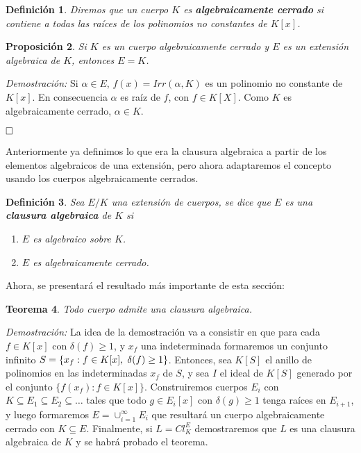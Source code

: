 \documentclass[12pt]{article}
\newtheorem{theorem}{Teorema}[section]
\newtheorem{proposition}[theorem]{Proposición}
\newtheorem{definition}[theorem]{Definición}
\begin{document}
\begin{definition} Diremos que un cuerpo $K$ es \textbf{algebraicamente cerrado} si contiene a todas las raíces de los polinomios no constantes de $K[x]$.
\end{definition}

\begin{proposition}Si $K$ es un cuerpo algebraicamente cerrado y $E$ es un extensión algebraica de $K$, entonces $E = K$.
\end{proposition}
\emph{Demostración: } Si $\alpha \in E$, $f(x) = Irr(\alpha, K)$ es un polinomio no constante de $K[x]$. En consecuencia $\alpha$ es raíz de $f$, con $f \in K[X]$. Como $K$ es algebraicamente cerrado, $\alpha \in K$.

$\hfill \square$

Anteriormente ya definimos lo que era la clausura algebraica a partir de los elementos algebraicos de una extensión, pero ahora adaptaremos el concepto usando los cuerpos algebraicamente cerrados.
\begin{definition} Sea $E/K$ una extensión de cuerpos, se dice que $E$ es una \textbf{clausura algebraica} de $K$ si \begin{enumerate}
\item $E$ es algebraico sobre $K$.
\item $E$ es algebraicamente cerrado.
\end{enumerate}
\end{definition}

Ahora, se presentará el resultado más importante de esta sección:
\begin{theorem}
Todo cuerpo admite una clausura algebraica.
\end{theorem}
\emph{Demostración: } La idea de la demostración va a consistir en que para cada $f \in K[x]$ con $\delta (f) \geq 1$, y $x_{f}$ una indeterminada formaremos un conjunto infinito $S = \lbrace x_{f} : f \in K[x], \hspace{0.1cm} \delta (f) \geq 1 \rbrace$. Entonces, sea $K[S]$ el anillo de polinomios en las indeterminadas $x_{f}$ de $S$, y sea $I$ el ideal de $K[S]$ generado por el conjunto $\lbrace f(x_{f}): f \in K[x]\rbrace$. Construiremos cuerpos $E_{i}$ con $K \subseteq E_{1} \subseteq E_{2} \subseteq \ldots$ tales que todo $g \in E_{i}[x]$ con $\delta (g) \geq 1$ tenga raíces en $E_{i+1}$, y luego formaremos $E = \cup_{i=1}^{\infty} E_{i}$ que resultará un cuerpo algebraicamente cerrado con $K \subseteq E$. Finalmente, si $L = Cl_{K}^{E}$ demostraremos que $L$ es una clausura algebraica de $K$ y se habrá probado el teorema.
\end{document}
